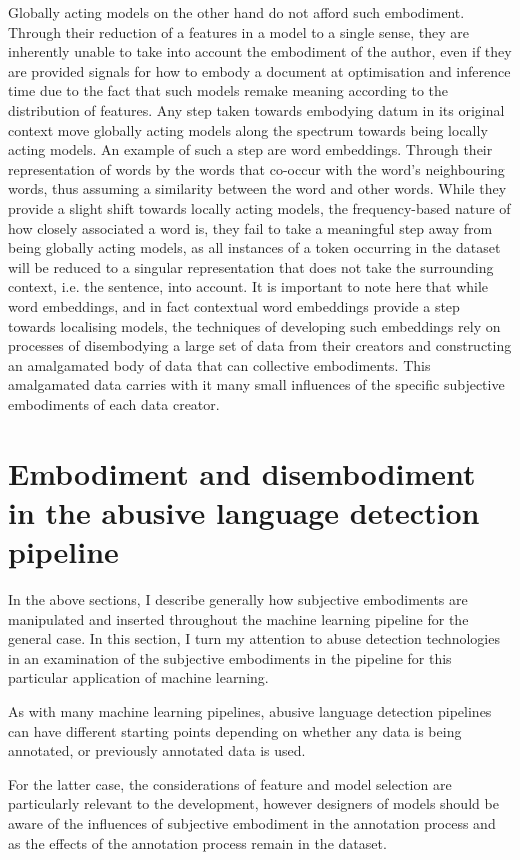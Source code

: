 Globally acting models on the other hand do not afford such embodiment. Through their reduction of a features in a model to a single sense, they are inherently unable to take into account the embodiment of the author, even if they are provided signals for how to embody a document at optimisation and inference time due to the fact that such models remake meaning according to the distribution of features. Any step taken towards embodying datum in its original context move globally acting models along the spectrum towards being locally acting models. An example of such a step are word embeddings. Through their representation of words by the words that co-occur with the word's neighbouring words, thus assuming a similarity between the word and other words. While they provide a slight shift towards locally acting models, the frequency-based nature of how closely associated a word is, they fail to take a meaningful step away from being globally acting models, as all instances of a token occurring in the dataset will be reduced to a singular representation that does not take the surrounding context, i.e. the sentence, into account.
It is important to note here that while word embeddings, and in fact contextual word embeddings provide a step towards localising models, the techniques of developing such embeddings rely on processes of disembodying a large set of data from their creators and constructing an amalgamated body of data that can collective embodiments. This amalgamated data carries with it many small influences of the specific subjective embodiments of each data creator.

\section{Embodiment and disembodiment in the abusive language detection pipeline}
In the above sections, I describe generally how subjective embodiments are manipulated and inserted throughout the machine learning pipeline for the general case. In this section, I turn my attention to abuse detection technologies in an examination of the subjective embodiments in the pipeline for this particular application of machine learning.

As with many machine learning pipelines, abusive language detection pipelines can have different starting points depending on whether any data is being annotated, or previously annotated data is used.

For the latter case, the considerations of feature and model selection  are particularly relevant to the development, however designers of models should be aware of the influences of subjective embodiment in the annotation process and as the effects of the annotation process remain in the dataset.


